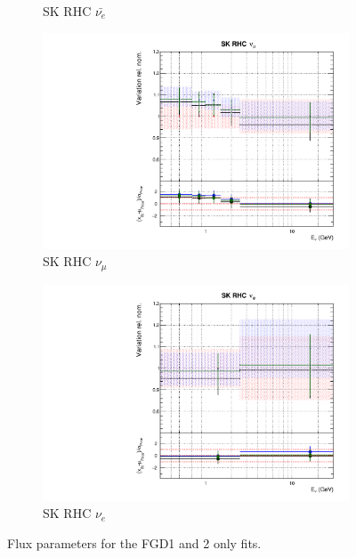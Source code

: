 \begin{figure}
\begin{subfigure}{0.24\textwidth}
  \caption{SK RHC $\bar{\nu_e}$}
\end{subfigure}
\begin{subfigure}{0.24\textwidth}
  \centering
  \includegraphics[width=0.95\linewidth]{figs/fgdfitsflux_14}
  \caption{SK RHC $\nu_{\mu}$}
\end{subfigure}
\begin{subfigure}{0.24\textwidth}
  \centering
  \includegraphics[width=0.95\linewidth]{figs/fgdfitsflux_15}
  \caption{SK RHC $\nu_e$}
\end{subfigure}
\caption{Flux parameters for the FGD1 and 2 only fits.}
\label{fig:fgdflux}
\end{figure}

